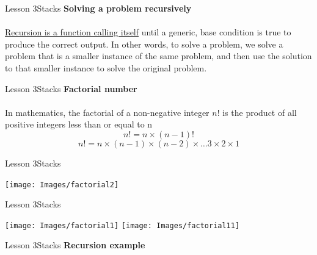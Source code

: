 \documentclass[aspectratio=1610]{beamer}
\begin{document}
\begin{frame}{Lesson 3}{Stacks}
\LARGE
\textbf{Solving a problem recursively}\\~\\
\underline{Recursion is a function calling itself} until a generic,
base condition is true to produce the correct output. In other 
words, to solve a problem, we solve a problem that is a smaller
instance of the same problem, and then use the solution to that
smaller instance to solve the original problem.
\end{frame}



\begin{frame}{Lesson 3}{Stacks}
\LARGE
\textbf{Factorial number}\\~\\
In mathematics, the factorial of a non-negative integer 
$n!$ is the product of all positive integers less than or equal to n
\begin{equation}
n!=n \times (n-1)!
\end{equation}
\begin{equation}
n! = n \times (n-1) \times (n-2) \times \dots 3 \times 2 \times 1
\end{equation}
\end{frame}


\begin{frame}{Lesson 3}{Stacks}
\begin{center}
\texttt{[image: Images/factorial2]}
\end{center}
\end{frame}



\begin{frame}{Lesson 3}{Stacks}
\begin{center}
\texttt{[image: Images/factorial1]}
\texttt{[image: Images/factorial11]}
\end{center}
\end{frame}



\begin{frame}{Lesson 3}{Stacks}
\Large
\textbf{Recursion example}\\~\\
\label{factorial}
\begin{algorithmic}[1]
    \State {}
\Else
    \State {}
\EndIf
\EndProcedure
\end{algorithmic}
\end{frame}
\end{document}
